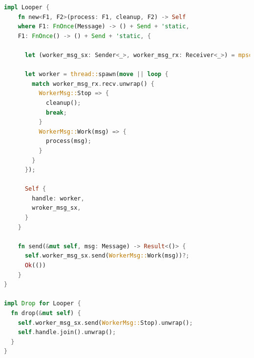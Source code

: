 \documentclass[12pt]{article}
\begin{document}
\begin{itemize}
\begin{lstlisting}[language=rust]
impl Looper {
    fn new<F1, F2>(process: F1, cleanup, F2) -> Self
    where F1: FnOnce(Message) -> () + Send + 'static,
    F1: FnOnce() -> () + Send + 'static, {

      let (worker_msg_sx: Sender<_>, worker_msg_rx: Receiver<_>) = mpsc::channel();

      let worker = thread::spawn(move || loop {
        match worker_msg_rx.recv.unwrap() {
          WorkerMsg::Stop => {
            cleanup();
            break;
          }
          WorkerMsg::Work(msg) => {
            process(msg);
          }
        }
      });
      
      Self {
        handle: worker,
        wroker_msg_sx,
      }
    }

    fn send(&mut self, msg: Message) -> Result<()> {
      self.worker_msg_sx.send(WorkerMsg::Work(msg))?;
      Ok(())
    }
}

impl Drop for Looper {
  fn drop(&mut self) {
    self.worker_msg_sx.send(WorkerMsg::Stop).unwrap();
    self.handle.join().unwrap();
  }
}
  \end{lstlisting}
  
  

  
\end{itemize}
\end{document}
